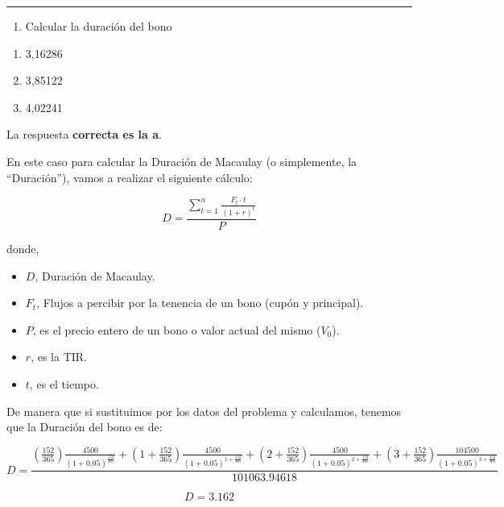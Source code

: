 \documentclass[
  letterpaper,
  DIV=11,
  numbers=noendperiod]{scrartcl}
\providecommand{\tightlist}{%
  \setlength{\itemsep}{0pt}\setlength{\parskip}{0pt}}\usepackage{longtable,booktabs,array}
\begin{document}
\begin{center}\rule{0.5\linewidth}{0.5pt}\end{center}

\begin{enumerate}
\def\labelenumi{\arabic{enumi}.}
\setcounter{enumi}{1}
\tightlist
\item
  Calcular la duración del bono
\end{enumerate}

\begin{enumerate}
\def\labelenumi{\alph{enumi}.}
\item
  3,16286
\item
  3,85122
\item
  4,02241
\end{enumerate}

\begin{tcolorbox}[enhanced jigsaw, colframe=quarto-callout-tip-color-frame, opacityback=0, opacitybacktitle=0.6, colback=white, leftrule=.75mm, bottomtitle=1mm, colbacktitle=quarto-callout-tip-color!10!white, coltitle=black, toprule=.15mm, left=2mm, breakable, toptitle=1mm, titlerule=0mm, title=\textcolor{quarto-callout-tip-color}{\faLightbulb}\hspace{0.5em}{Solución}, arc=.35mm, rightrule=.15mm, bottomrule=.15mm]

La respuesta \textbf{correcta es la a}.

En este caso para calcular la Duración de Macaulay (o simplemente, la
``Duración''), vamos a realizar el siguiente cálculo:

\[D=\frac{\sum_{t=1}^{n}\frac{F_t\cdot t}{\left(1+r\right)^t}}{P}\]

donde,

\begin{itemize}
\item
  \(D\), Duración de Macaulay.
\item
  \(F_t\), Flujos a percibir por la tenencia de un bono (cupón y
  principal).
\item
  \(P\), es el precio entero de un bono o valor actual del mismo
  (\(V_0\)).
\item
  \(r\), es la TIR.
\item
  \(t\), es el tiempo.
\end{itemize}

De manera que si sustituimos por los datos del problema y calculamos,
tenemos que la Duración del bono es de:

\[D=\frac{\left(\frac{152}{365}\right)\frac{4500}{\left(1+0.05\right)^{\frac{152}{365}}}+\left(1+\frac{152}{365}\right)\frac{4500}{\left(1+0.05\right)^{1+\frac{152}{365}}}+\left(2+\frac{152}{365}\right)\frac{4500}{\left(1+0.05\right)^{2+\frac{152}{365}}}+\left(3+\frac{152}{365}\right)\frac{104500}{\left(1+0.05\right)^{3+\frac{152}{365}}}}{101063.94618}\]

\[D=3.162\]

\end{tcolorbox}
\end{document}
